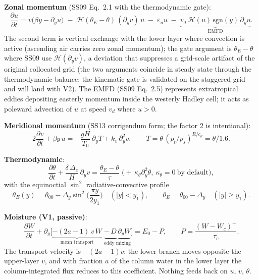 \documentclass[11pt]{article}
\newcommand{\py}{\partial_y}
\newcommand{\Hv}{\mathcal{H}}
\begin{document}
\textbf{Zonal momentum} (SS09 Eq.~2.1 with the thermodynamic gate):
\begin{equation}
\frac{\partial u}{\partial t}
= v\big(\beta y - \py u\big)
\;-\; \Hv(\theta_E - \theta)\,(\py v)\,u
\;-\; \varepsilon_u u
\;-\; \underbrace{v_d\,\Hv(u)\,\mathrm{sgn}(y)\,\py u}_{\text{EMFD}} .
\end{equation}
The second term is vertical exchange with the lower layer where convection
is active (ascending air carries zero zonal momentum); the gate argument is
$\theta_E - \theta$ where SS09 use $\Hv(\py v)$, a deviation that suppresses
a grid-scale artifact of the original collocated grid (the two arguments
coincide in steady state through the thermodynamic balance; the kinematic
gate is validated on the staggered grid and will land with V2). The EMFD
(SS09 Eq.~2.5) represents extratropical eddies depositing easterly momentum
inside the westerly Hadley cell; it acts as poleward advection of $u$ at
speed $v_d$ where $u > 0$.

\textbf{Meridional momentum} (SS13 corrigendum form; the factor 2 is
intentional):
\begin{equation}
2\frac{\partial v}{\partial t} + \beta y\,u
= -\frac{gH}{T_0}\,\py T + k_v\,\partial_y^2 v,
\qquad T = \theta\,(p_t/p_s)^{R/c_p} = \theta/1.6 .
\end{equation}

\textbf{Thermodynamic}:
\begin{equation}
\frac{\partial \theta}{\partial t}
+ \frac{\delta\,\Delta_z}{H}\,\py v
= \frac{\theta_E - \theta}{\tau}
\;\big(+\,\kappa_\theta \partial_y^2 \theta,\ \kappa_\theta = 0\ \text{by
default}\big),
\end{equation}
with the equinoctial $\sin^2$ radiative-convective profile
\begin{equation}
\theta_E(y) = \theta_{00} - \Delta_y \sin^2\!\Big(\frac{\pi y}{2 y_1}\Big)
\quad (|y| < y_1), \qquad
\theta_E = \theta_{00} - \Delta_y \quad (|y| \ge y_1).
\end{equation}

\textbf{Moisture (V1, passive)}:
\begin{equation}
\frac{\partial W}{\partial t}
+ \py\big[\underbrace{-(2a{-}1)\,v\,W}_{\text{mean transport}}
\;\underbrace{-\,D\,\py W}_{\text{eddy mixing}}\big]
= E_0 - P,
\qquad P = \frac{(W - W_c)^+}{\tau_c}.
\end{equation}
The transport velocity is $-(2a{-}1)v$: the lower branch moves opposite the
upper-layer $v$, and with fraction $a$ of the column water in the lower
layer the column-integrated flux reduces to this coefficient. Nothing feeds
back on $u$, $v$, $\theta$.
\end{document}
